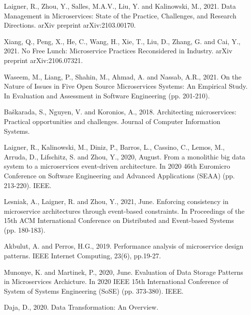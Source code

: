 \documentclass[a4paper,12pt]{article}
\begin{document}
 
 







\newpage



\begin{thebibliography}{}
	
	 Laigner, R., Zhou, Y., Salles, M.A.V., Liu, Y. and Kalinowski, M., 2021. Data Management in Microservices: State of the Practice, Challenges, and Research Directions. arXiv preprint arXiv:2103.00170.   
	
Xiang, Q., Peng, X., He, C., Wang, H., Xie, T., Liu, D., Zhang, G. and Cai, Y., 2021. No Free Lunch: Microservice Practices Reconsidered in Industry. arXiv preprint arXiv:2106.07321.

Waseem, M., Liang, P., Shahin, M., Ahmad, A. and Nassab, A.R., 2021. On the Nature of Issues in Five Open Source Microservices Systems: An Empirical Study. In Evaluation and Assessment in Software Engineering (pp. 201-210).

Baškarada, S., Nguyen, V. and Koronios, A., 2018. Architecting microservices: Practical opportunities and challenges. Journal of Computer Information Systems.

Laigner, R., Kalinowski, M., Diniz, P., Barros, L., Cassino, C., Lemos, M., Arruda, D., Lifschitz, S. and Zhou, Y., 2020, August. From a monolithic big data system to a microservices event-driven architecture. In 2020 46th Euromicro Conference on Software Engineering and Advanced Applications (SEAA) (pp. 213-220). IEEE.

Lesniak, A., Laigner, R. and Zhou, Y., 2021, June. Enforcing consistency in microservice architectures through event-based constraints. In Proceedings of the 15th ACM International Conference on Distributed and Event-based Systems (pp. 180-183).

Akbulut, A. and Perros, H.G., 2019. Performance analysis of microservice design patterns. IEEE Internet Computing, 23(6), pp.19-27.

Munonye, K. and Martinek, P., 2020, June. Evaluation of Data Storage Patterns in Microservices Archicture. In 2020 IEEE 15th International Conference of System of Systems Engineering (SoSE) (pp. 373-380). IEEE.

Daja, D., 2020. Data Transformation: An Overview.


\end{thebibliography}
\end{document}
